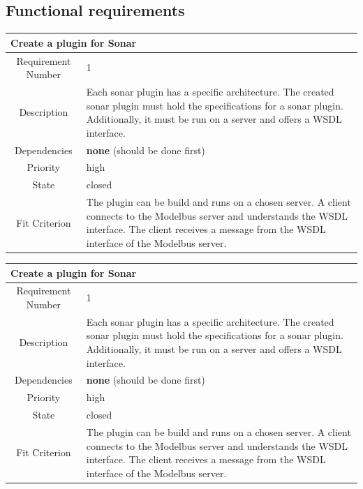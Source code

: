 \subsection{Functional requirements}
\begin{longtable}{|c|p{10cm}|}
\hline 
\multicolumn{2}{|l|}{\textbf{Create a plugin for Sonar}} \\ 
\hline 
Requirement Number & 1 \\ \hline 
Description & Each sonar plugin has a specific architecture. The created sonar plugin must hold the specifications for a sonar plugin. Additionally, it must be run on a server and offers a WSDL interface. \\ \hline 
Dependencies & \textbf{none} (should be done first) \\ \hline 
Priority & high \\ \hline 
State & closed \\ \hline 
Fit Criterion & The plugin can be build and runs on a chosen server. A client connects to the Modelbus server and understands the WSDL interface. The client receives a message from the WSDL interface of the Modelbus server. \\ \hline 
\end{longtable}

\begin{longtable}{|c|p{10cm}|}
\hline 
\multicolumn{2}{|l|}{\textbf{Create a plugin for Sonar}} \\ 
\hline 
Requirement Number & 1 \\ \hline 
Description & Each sonar plugin has a specific architecture. The created sonar plugin must hold the specifications for a sonar plugin. Additionally, it must be run on a server and offers a WSDL interface. \\ \hline 
Dependencies & \textbf{none} (should be done first) \\ \hline 
Priority & high \\ \hline 
State & closed \\ \hline 
Fit Criterion & The plugin can be build and runs on a chosen server. A client connects to the Modelbus server and understands the WSDL interface. The client receives a message from the WSDL interface of the Modelbus server. \\ \hline 
\end{longtable}

